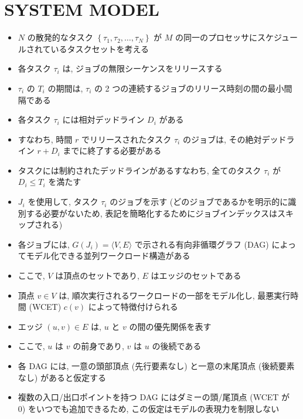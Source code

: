 
\section{SYSTEM MODEL}
\label{sec: system model}

\begin{frame}{}
    \begin{itemize}
        \item $N$ の散発的なタスク $\left\{\tau_{1}, \tau_{2}, \ldots, \tau_{N}\right\}$ が $M$ の同一のプロセッサにスケジュールされているタスクセットを考える
\item 各タスク $\tau_{i}$ は, ジョブの無限シーケンスをリリースする
\item $\tau_{i}$ の $T_{i}$ の期間は, $\tau_{i}$ の 2 つの連続するジョブのリリース時刻の間の最小間隔である
\item 各タスク $\tau_{i}$ には相対デッドライン $D_{i}$ がある
\item すなわち, 時間 $r$ でリリースされたタスク $\tau_{i}$ のジョブは, その絶対デッドライン $r+D_{i}$ までに終了する必要がある
\item タスクには制約されたデッドラインがあるすなわち, 全てのタスク $\tau_{i}$ が $D_{i} \leq T_{i}$ を満たす
    \end{itemize}
\end{frame}

\begin{frame}{}
    \begin{itemize}
        \item  $J_{i}$ を使用して, タスク $\tau_{i}$ のジョブを示す (どのジョブであるかを明示的に識別する必要がないため, 表記を簡略化するためにジョブインデックスはスキップされる)
\item 各ジョブには, $G\left(J_{i}\right)=\langle V, E\rangle$ で示される有向非循環グラフ (DAG) によってモデル化できる並列ワークロード構造がある
\item ここで, $V$ は頂点のセットであり, $E$ はエッジのセットである
\item 頂点 $v \in V$ は, 順次実行されるワークロードの一部をモデル化し, 最悪実行時間 (WCET) $c(v)$ によって特徴付けられる
\item エッジ $(u, v) \in E$ は, $u$ と $v$ の間の優先関係を表す
\item ここで, $u$ は $v$ の前身であり, $v$ は $u$ の後続である
\item 各 DAG には, 一意の頭部頂点 (先行要素なし) と一意の末尾頂点 (後続要素なし) があると仮定する
\item 複数の入口/出口ポイントを持つ DAG にはダミーの頭/尾頂点 (WCET が 0) をいつでも追加できるため, この仮定はモデルの表現力を制限しない
    \end{itemize}
\end{frame}

